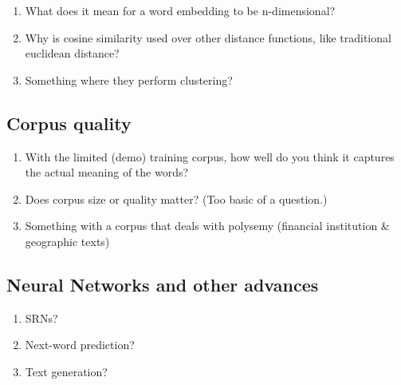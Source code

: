 \begin{enumerate}
\item What does it mean for a word embedding to be n-dimensional?
\item Why is cosine similarity used over other distance functions, like traditional euclidean distance?
\item Something where they perform clustering?
\end{enumerate}

\subsection{Corpus quality}

\begin{enumerate}
\item With the limited (demo) training corpus, how well do you think it captures the actual meaning of the words?
\item Does corpus size or quality matter? (Too basic of a question.)
\item Something with a corpus that deals with polysemy (financial institution \& geographic texts)
\end{enumerate}

\subsection{Neural Networks and other advances}

\begin{enumerate}
\item SRNs?
\item Next-word prediction?
\item Text generation?
\end{enumerate}